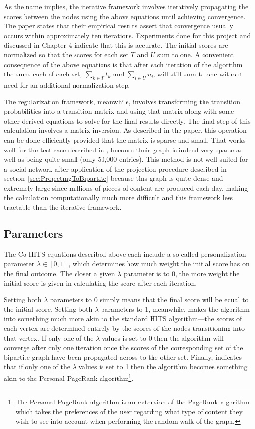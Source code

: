 As the name implies, the iterative framework involves iteratively propagating the scores between the nodes using the above equations until achieving convergence. The paper states that their empirical results assert that convergence usually occurs within approximately ten iterations. Experiments done for this project and discussed in Chapter 4 indicate that this is accurate. The initial scores are normalized so that the scores for each set $T$ and $U$ sum to one. A convenient consequence of the above equations is that after each iteration of the algorithm the sums each of each set, $\sum\limits_{k \in T} t_{k}$ and $\sum\limits_{i \in U} u_{i}$, will still sum to one without need for an additional normalization step.

The regularization framework, meanwhile, involves transforming the transition probabilities into a transition matrix and using that matrix along with some other derived equations to solve for the final results directly. The final step of this calculation involves a matrix inversion. As described in the paper, this operation can be done efficiently provided that the matrix is sparse and small. That works well for the test case described in \cite{Deng2009}, because their graph is indeed very sparse as well as being quite small (only 50,000 entries). This method is not well suited for a social network after application of the projection procedure described in section~\ref{sec:ProjectingToBipartite} because this graph is quite dense and extremely large since millions of pieces of content are produced each day, making the calculation computationally much more difficult and this framework less tractable than the iterative framework.


\subsection{Parameters}
\label{sec:CoHitsParameters}

The Co-HITS equations described above each include a so-called personalization parameter $\lambda \in [0,1]$, which determines how much weight the initial score has on the final outcome. The closer a given $\lambda$ parameter is to 0, the more weight the initial score is given in calculating the score after each iteration.

Setting both $\lambda$ parameters to 0 simply means that the final score will be equal to the initial score. Setting both $\lambda$ parameters to 1, meanwhile, makes the algorithm into something much more akin to the standard HITS algorithm---the scores of each vertex are determined entirely by the scores of the nodes transitioning into that vertex. If only one of the $\lambda$ values is set to 0 then the algorithm will converge after only one iteration once the scores of the corresponding set of the bipartite graph have been propagated across to the other set. Finally, \cite{Deng2009} indicates that if only one of the $\lambda$ values is set to 1 then the algorithm becomes something akin to the Personal PageRank algorithm\footnote{The Personal PageRank algorithm is an extension of the PageRank algorithm which takes the preferences of the user regarding what type of content they wish to see into account when performing the random walk of the graph.}.

